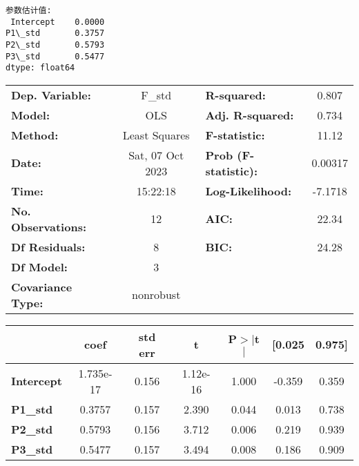 \documentclass[11pt]{article}
\newcommand{\prompt}[4]{
        {\ttfamily\llap{{\color{#2}[#3]:\hspace{3pt}#4}}\vspace{-\baselineskip}}
    }
\begin{document}
    \begin{Verbatim}[commandchars=\\\{\}]
参数估计值:
 Intercept    0.0000
P1\_std       0.3757
P2\_std       0.5793
P3\_std       0.5477
dtype: float64
    \end{Verbatim}
 
            
\prompt{Out}{outcolor}{89}{}
    
    \begin{center}
\begin{tabular}{lclc}
\toprule
\textbf{Dep. Variable:}    &      F\_std      & \textbf{  R-squared:         } &     0.807   \\
\textbf{Model:}            &       OLS        & \textbf{  Adj. R-squared:    } &     0.734   \\
\textbf{Method:}           &  Least Squares   & \textbf{  F-statistic:       } &     11.12   \\
\textbf{Date:}             & Sat, 07 Oct 2023 & \textbf{  Prob (F-statistic):} &  0.00317    \\
\textbf{Time:}             &     15:22:18     & \textbf{  Log-Likelihood:    } &   -7.1718   \\
\textbf{No. Observations:} &          12      & \textbf{  AIC:               } &     22.34   \\
\textbf{Df Residuals:}     &           8      & \textbf{  BIC:               } &     24.28   \\
\textbf{Df Model:}         &           3      & \textbf{                     } &             \\
\textbf{Covariance Type:}  &    nonrobust     & \textbf{                     } &             \\
\bottomrule
\end{tabular}
\begin{tabular}{lcccccc}
                   & \textbf{coef} & \textbf{std err} & \textbf{t} & \textbf{P$> |$t$|$} & \textbf{[0.025} & \textbf{0.975]}  \\
\midrule
\textbf{Intercept} &    1.735e-17  &        0.156     &  1.12e-16  &         1.000        &       -0.359    &        0.359     \\
\textbf{P1\_std}   &       0.3757  &        0.157     &     2.390  &         0.044        &        0.013    &        0.738     \\
\textbf{P2\_std}   &       0.5793  &        0.156     &     3.712  &         0.006        &        0.219    &        0.939     \\
\textbf{P3\_std}   &       0.5477  &        0.157     &     3.494  &         0.008        &        0.186    &        0.909     \\

\end{tabular}
\end{center}
\end{document}
